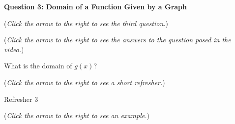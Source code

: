 \documentclass{ximera}
\begin{document}
\textbf{Question 3: Domain of a Function Given by a Graph}
\begin{question}
\begin{flushright}
{\color{blue}(\emph{Click the arrow to the right to see the third question.})}
\end{flushright}
\begin{center}
\begin{expandable}
{\color{blue}(\emph{Click the arrow to the right to see the answers 
to the question posed in the video.})}
\begin{expandable}
What is the domain of $g(x)$?
\begin{multipleChoice}
\choice[correct]{$[-1,1)\cup(1,3]\cup[4,6]$}
\choice{$[-1,3]\cup[4,6]$}
\choice{$\{2\} \cup [6,15)$}
\choice{$\{2\}\cup [9,15)$}
\choice{$\{2\} \cup [6,9)$}
\end{multipleChoice}
\begin{flushright}
{\color{blue}(\emph{Click the arrow to the right to see a short refresher.})}
\end{flushright}
\begin{expandable}
Refresher 3
\end{expandable}
\begin{flushright}
{\color{blue}(\emph{Click the arrow to the right to see an example.})}
\end{flushright}
\begin{expandable}
\end{expandable}
\end{expandable}
\end{expandable}
\end{center}
\end{question}
\end{document}
